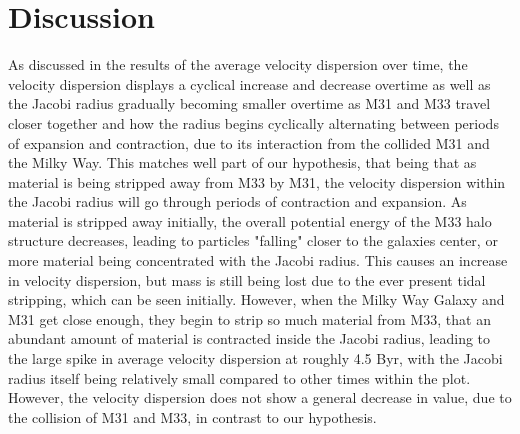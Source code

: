 \documentclass{aastex7}
\begin{document}
\section{Discussion}
As discussed in the results of the average velocity dispersion over time, the velocity dispersion displays a cyclical increase and decrease overtime as well as the Jacobi radius gradually becoming smaller overtime as M31 and M33 travel closer together and how the radius begins cyclically alternating between periods of expansion and contraction, due to its interaction from the collided M31 and the Milky Way. This matches well part of our hypothesis, that being that as material is being stripped away from M33 by M31, the velocity dispersion within the Jacobi radius will go through periods of contraction and expansion. As material is stripped away initially, the overall potential energy of the M33 halo structure decreases, leading to particles "falling" closer to the galaxies center, or more material being concentrated with the Jacobi radius. This causes an increase in velocity dispersion, but mass is still being lost due to the ever present tidal stripping, which can be seen initially. However, when the Milky Way Galaxy and M31 get close enough, they begin to strip so much material from M33, that an abundant amount of material is contracted inside the Jacobi radius, leading to the large spike in average velocity dispersion at roughly 4.5 Byr, with the Jacobi radius itself being relatively small compared to other times within the plot. However, the velocity dispersion does not show a general decrease in value, due to the collision of M31 and M33, in contrast to our hypothesis.
\end{document}
